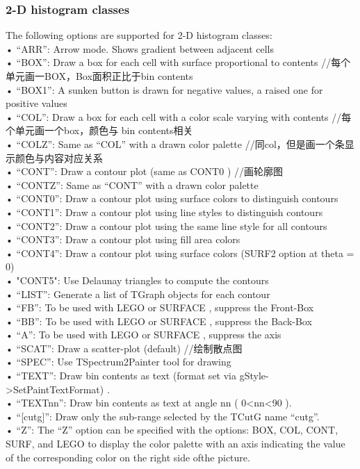 \documentclass[11pt,a4paper,titlepage]{article}
\begin{document}
{\subsubsection{2-D histogram classes}
The following options are supported for 2-D histogram classes:\\
• “ARR”: Arrow mode. Shows gradient between adjacent cells\\
• “BOX”: Draw a box for each cell with surface proportional to contents  //每个单元画一BOX，Box面积正比于bin contents\\
• “BOX1”: A sunken button is drawn for negative values, a raised one for positive values\\
• “COL”: Draw a box for each cell with a color scale varying with contents  //每个单元画一个box，颜色与 bin contents相关\\
• “COLZ”: Same as “COL” with a drawn color palette  //同col，但是画一个条显示颜色与内容对应关系\\
• “CONT”: Draw a contour plot (same as CONT0 )  //画轮廓图\\
• “CONTZ”: Same as “CONT” with a drawn color palette\\
• “CONT0”: Draw a contour plot using surface colors to distinguish contours\\
• “CONT1”: Draw a contour plot using line styles to distinguish contours\\
• “CONT2”: Draw a contour plot using the same line style for all contours\\
• “CONT3”: Draw a contour plot using fill area colors\\
• “CONT4”: Draw a contour plot using surface colors (SURF2 option at theta = 0)\\
• "CONT5": Use Delaunay triangles to compute the contours\\
• “LIST”: Generate a list of TGraph objects for each contour\\
• “FB”: To be used with LEGO or SURFACE , suppress the Front-Box\\
• “BB”: To be used with LEGO or SURFACE , suppress the Back-Box\\
• “A”: To be used with LEGO or SURFACE , suppress the axis\\
• “SCAT”: Draw a scatter-plot (default)  //绘制散点图\\
• “SPEC”: Use TSpectrum2Painter tool for drawing\\
• “TEXT”: Draw bin contents as text (format set via gStyle->SetPaintTextFormat) .\\
• “TEXTnn”: Draw bin contents as text at angle nn ( 0<nn<90 ).\\
• “[cutg]”: Draw only the sub-range selected by the TCutG name “cutg”.\\
• “Z”: The “Z” option can be specified with the options: BOX, COL, CONT, SURF, and LEGO to display the color palette with an axis indicating the value of the corresponding color on the right side ofthe picture.\\

}
\end{document}
